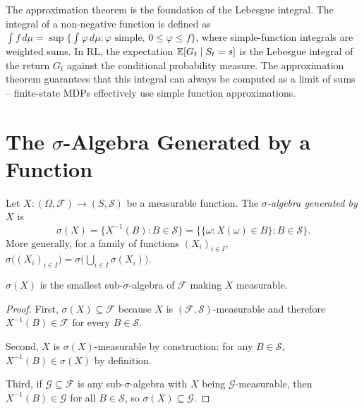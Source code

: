 \documentclass[11pt,a4paper]{article}
\begin{document}
\begin{rlconnection}[title={Connection to RL}]
The approximation theorem is the foundation of the Lebesgue integral.
The integral of a non-negative function is defined as
$\int f\,d\mu = \sup\{\int \varphi\,d\mu : \varphi \text{ simple},\,
0 \leq \varphi \leq f\}$, where simple-function integrals are weighted
sums. In RL, the expectation $\mathbb{E}[G_t \mid S_t = s]$ is the Lebesgue
integral of the return $G_t$ against the conditional probability measure.
The approximation theorem guarantees that this integral can always be
computed as a limit of sums -- finite-state MDPs effectively use simple
function approximations.
\end{rlconnection}


\section{The $\sigma$-Algebra Generated by a Function}
\label{sec:sigma_X}

\begin{definition}[$\sigma(X)$]
\label{def:sigma_x}
Let $X: (\Omega, \mathcal{F}) \to (S, \mathcal{S})$ be a measurable
function. The \emph{$\sigma$-algebra generated by $X$} is
\begin{equation}
  \sigma(X) = \{X^{-1}(B) : B \in \mathcal{S}\}
            = \bigl\{\{\omega : X(\omega) \in B\} : B \in \mathcal{S}\bigr\}.
  \label{eq:sigma_x}
\end{equation}
More generally, for a family of functions $(X_i)_{i \in I}$,
$\sigma\bigl((X_i)_{i \in I}\bigr) = \sigma\bigl(\bigcup_{i \in I}
\sigma(X_i)\bigr)$.
\end{definition}

\begin{proposition}
\label{prop:sigma_x_smallest}
$\sigma(X)$ is the smallest sub-$\sigma$-algebra of $\mathcal{F}$ making
$X$ measurable.
\end{proposition}

\begin{proof}
First, $\sigma(X) \subseteq \mathcal{F}$ because $X$ is
$(\mathcal{F}, \mathcal{S})$-measurable and therefore
$X^{-1}(B) \in \mathcal{F}$ for every $B \in \mathcal{S}$.

Second, $X$ is $\sigma(X)$-measurable by construction: for any
$B \in \mathcal{S}$, $X^{-1}(B) \in \sigma(X)$ by definition.

Third, if $\mathcal{G} \subseteq \mathcal{F}$ is any sub-$\sigma$-algebra
with $X$ being $\mathcal{G}$-measurable, then $X^{-1}(B) \in \mathcal{G}$
for all $B \in \mathcal{S}$, so $\sigma(X) \subseteq \mathcal{G}$.
\end{proof}
\end{document}
